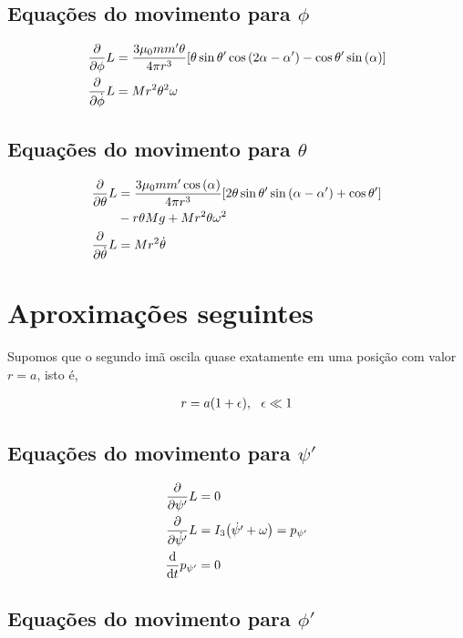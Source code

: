 \documentclass[a4paper, 12pt]{article}
\begin{document}
\subsection{Equações do movimento para $\phi$}

\begin{align}
    \pdv{}{\phi}L&=\frac{3\mu_0mm'\theta}{4\pi r^3}\qty[\theta\sin\theta'\cos\qty(2\alpha-\alpha')-\cos\theta'\sin\qty(\alpha)]\nonumber\\
    \pdv{}{\dot{\phi}}L&=Mr^2\theta^2\omega\nonumber
\end{align}

\subsection{Equações do movimento para $\theta$}

\begin{align}
    \pdv{}{\theta}L&=\frac{3\mu_0mm'\cos\qty(\alpha)}{4\pi r^3}\qty[2\theta\sin\theta'\sin\qty(\alpha-\alpha')+\cos\theta']\nonumber\\
    &-r\theta Mg+Mr^2\theta\omega^2\nonumber\\
    \pdv{}{\dot{\theta}}L&=Mr^2\dot{\theta}\nonumber
\end{align}

\section{Aproximações seguintes}

Supomos que o segundo imã oscila quase exatamente em uma posição com valor $r = a$, isto é, 

\begin{align}
    r = a\qty(1+\epsilon),\ \ \epsilon\ll 1
\end{align}

\subsection{Equações do movimento para $\psi'$}

\begin{align}
    \pdv{}{\psi'}L&=0\nonumber\\
    \pdv{}{\dot{\psi'}}L&=I_3\qty(\dot{\psi'}+\omega)=p_{\psi'}\nonumber\\
    \dv{}{t}p_{\psi'}&=0
\end{align}

\subsection{Equações do movimento para $\phi'$}
\end{document}
